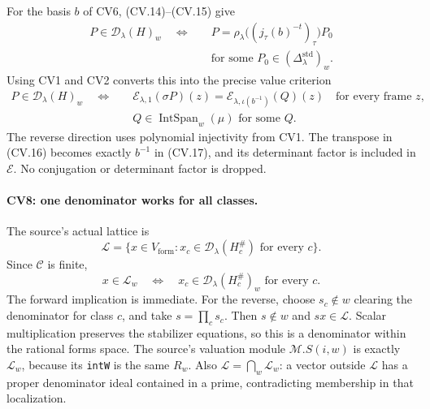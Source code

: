 For the basis \(b\) of CV6, (CV.14)--(CV.15) give
\[
 \begin{split}
 P\in\mathcal D_\lambda(H)_w
 \quad\Longleftrightarrow\quad&
 P=\rho_\lambda\bigl((j_\tau(b)^{-t})_\tau\bigr)P_0\\
 &\text{for some }
             P_0\in(\Delta_\lambda^{\mathrm{std}})_w.
 \end{split}                                                   \tag{CV.16}
\]
Using CV1 and CV2 converts this into the precise value
criterion
\[
 \begin{split}
 P\in\mathcal D_\lambda(H)_w
 \quad\Longleftrightarrow\quad&
 \mathcal E_{\lambda,1}(\sigma P)(z)
      =\mathcal E_{\lambda,\iota(b^{-1})}(Q)(z)
                       \quad\text{for every frame }z,\\
 & Q\in\operatorname{IntSpan}_w(\mu)
                  \text{ for some }Q .
 \end{split}                                                   \tag{CV.17}
\]
The reverse direction uses polynomial injectivity from CV1.
The transpose in (CV.16) becomes exactly \(b^{-1}\) in
(CV.17), and its determinant factor is included in
\(\mathcal E\). No conjugation or determinant factor is
dropped.

\paragraph{CV8: one denominator works for all classes.}
The source's actual lattice is
\[
 \mathcal L=
 \{x\in V_{\mathrm{form}}:
                x_c\in\mathcal D_\lambda(H_c^\#)
                               \text{ for every }c\}.
                                                               \tag{CV.18}
\]
Since \(\mathcal C\) is finite,
\[
 x\in\mathcal L_w
 \quad\Longleftrightarrow\quad
 x_c\in\mathcal D_\lambda(H_c^\#)_w
                              \text{ for every }c.            \tag{CV.19}
\]
The forward implication is immediate. For the reverse,
choose \(s_c\notin w\) clearing the denominator for class
\(c\), and take \(s=\prod_c s_c\).
Then \(s\notin w\) and \(sx\in\mathcal L\).
Scalar multiplication preserves the stabilizer equations,
so this is a denominator within the rational forms space.
The source's valuation module \(\mathcal M.S(i,w)\)
is exactly \(\mathcal L_w\), because its \texttt{intW}
is the same \(R_w\). Also
\(\mathcal L=\bigcap_w\mathcal L_w\): a vector outside
\(\mathcal L\) has a proper denominator ideal contained
in a prime, contradicting membership in that localization.

